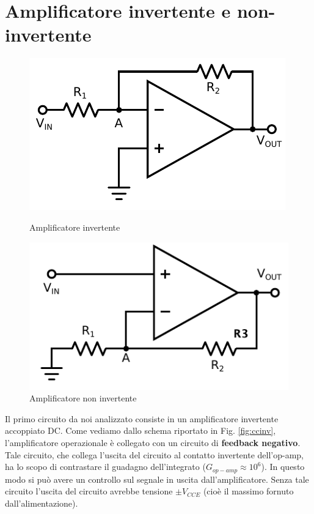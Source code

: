 \section{Amplificatore invertente e non-invertente}

\begin{figure}[h!]
\centering
		\begin{minipage}[c]{.4\textwidth}
			\centering

			\includegraphics[width=.65\textwidth]{ccinv.pdf}
			\caption{Amplificatore invertente}
			\label{fig:ccinv}

		\end{minipage}%
		\hspace{10mm}%
		\begin{minipage}[c]{.4\textwidth}
			\centering

			\includegraphics[width=.65\textwidth]{ccninv.pdf}
			\caption{Amplificatore non invertente}
			\label{fig:ccninv}
			
		\end{minipage}
\end{figure}

Il primo circuito da noi analizzato consiste in un amplificatore invertente accoppiato DC.
Come vediamo dallo schema riportato in Fig. \ref{fig:ccinv}, l'amplificatore operazionale è collegato con un circuito di \textbf{feedback negativo}.
Tale circuito, che collega l'uscita del circuito al contatto invertente dell'op-amp, ha lo scopo di contrastare il guadagno dell'integrato ($G_{op-amp} \approx 10^6$).
In questo modo si può avere un controllo sul segnale in uscita dall'amplificatore.
Senza tale circuito l'uscita del circuito avrebbe tensione $\pm V_{CCE}$ (cioè il massimo fornuto dall'alimentazione).

